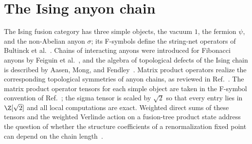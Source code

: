 
\section{The Ising anyon chain}%
\label{sec:asymex_ising_tensors}

The Ising fusion category has three simple objects, the vacuum $1$, the
fermion $\psi$, and the non-Abelian anyon $\sigma$; its F-symbols define
the string-net operators of Bultinck et
al.~\cite[Appendix~D.2]{Bultinck2017Anyons}. Chains of interacting anyons were
introduced for Fibonacci anyons by Feiguin et
al.~\cite{Feiguin2007GoldenChain}, and the
algebra of topological defects of the Ising chain is described by Aasen,
Mong, and Fendley~\cite{Aasen2016Topological}. Matrix product operators
realize the corresponding topological symmetries of anyon chains, as
reviewed in Ref.~\cite[Section~III.A.6]{Cirac2021Matrix}. The matrix product
operator tensors for each simple object are taken in the F-symbol convention of
Ref.~\cite[Appendix~D.2]{Bultinck2017Anyons}; the sigma tensor is scaled
by $\sqrt2$ so that every entry lies in $\Z[\sqrt2]$ and all local
computations are exact. Weighted direct sums of these tensors and
the weighted Verlinde action on a fusion-tree product state address
the question of whether the structure coefficients of a renormalization fixed
point can depend on the chain length~\cite[Theorem~4.14]{Cirac2016MPDO_arXiv}.

